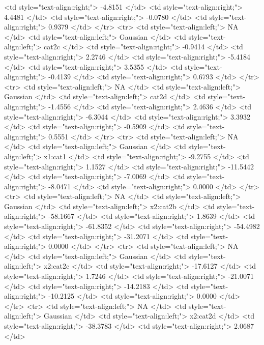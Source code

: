 \documentclass[a4paper]{article}
\begin{document}
\begin{HTML}
   <td style="text-align:right;"> -4.8151 </td>
   <td style="text-align:right;"> 4.4481 </td>
   <td style="text-align:right;"> -0.0780 </td>
   <td style="text-align:right;"> 0.9379 </td>
  </tr>
  <tr>
   <td style="text-align:left;"> NA </td>
   <td style="text-align:left;"> Gaussian </td>
   <td style="text-align:left;"> cat2c </td>
   <td style="text-align:right;"> -0.9414 </td>
   <td style="text-align:right;"> 2.2746 </td>
   <td style="text-align:right;"> -5.4184 </td>
   <td style="text-align:right;"> 3.5355 </td>
   <td style="text-align:right;"> -0.4139 </td>
   <td style="text-align:right;"> 0.6793 </td>
  </tr>
  <tr>
   <td style="text-align:left;"> NA </td>
   <td style="text-align:left;"> Gaussian </td>
   <td style="text-align:left;"> cat2d </td>
   <td style="text-align:right;"> -1.4556 </td>
   <td style="text-align:right;"> 2.4636 </td>
   <td style="text-align:right;"> -6.3044 </td>
   <td style="text-align:right;"> 3.3932 </td>
   <td style="text-align:right;"> -0.5909 </td>
   <td style="text-align:right;"> 0.5551 </td>
  </tr>
  <tr>
   <td style="text-align:left;"> NA </td>
   <td style="text-align:left;"> Gaussian </td>
   <td style="text-align:left;"> x1:cat1 </td>
   <td style="text-align:right;"> -9.2755 </td>
   <td style="text-align:right;"> 1.1527 </td>
   <td style="text-align:right;"> -11.5442 </td>
   <td style="text-align:right;"> -7.0069 </td>
   <td style="text-align:right;"> -8.0471 </td>
   <td style="text-align:right;"> 0.0000 </td>
  </tr>
  <tr>
   <td style="text-align:left;"> NA </td>
   <td style="text-align:left;"> Gaussian </td>
   <td style="text-align:left;"> x2:cat2b </td>
   <td style="text-align:right;"> -58.1667 </td>
   <td style="text-align:right;"> 1.8639 </td>
   <td style="text-align:right;"> -61.8352 </td>
   <td style="text-align:right;"> -54.4982 </td>
   <td style="text-align:right;"> -31.2071 </td>
   <td style="text-align:right;"> 0.0000 </td>
  </tr>
  <tr>
   <td style="text-align:left;"> NA </td>
   <td style="text-align:left;"> Gaussian </td>
   <td style="text-align:left;"> x2:cat2c </td>
   <td style="text-align:right;"> -17.6127 </td>
   <td style="text-align:right;"> 1.7246 </td>
   <td style="text-align:right;"> -21.0071 </td>
   <td style="text-align:right;"> -14.2183 </td>
   <td style="text-align:right;"> -10.2125 </td>
   <td style="text-align:right;"> 0.0000 </td>
  </tr>
  <tr>
   <td style="text-align:left;"> NA </td>
   <td style="text-align:left;"> Gaussian </td>
   <td style="text-align:left;"> x2:cat2d </td>
   <td style="text-align:right;"> -38.3783 </td>
   <td style="text-align:right;"> 2.0687 </td>

\end{HTML}
\end{document}
